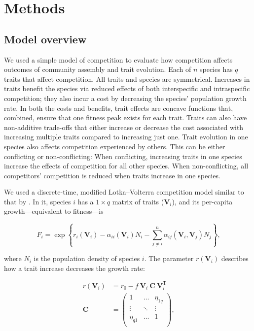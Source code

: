 
\section*{Methods}


\subsection*{Model overview}

We used a simple model of competition to evaluate how competition affects
outcomes of community assembly and trait evolution.
Each of $n$ species has $q$ traits that affect competition.
All traits and species are symmetrical.
Increases in traits benefit the species via reduced
effects of both interspecific and intraspecific competition;
they also incur a cost by decreasing the species' population growth rate.
In both the costs and benefits, trait effects are concave functions that,
combined, ensure that one fitness peak exists for each trait.
Traits can also have non-additive trade-offs that either increase or decrease
the cost associated with increasing multiple traits compared to increasing
just one.
Trait evolution in one species also affects competition experienced by others.
This can be either conflicting or non-conflicting:
When conflicting, increasing traits in one species increase the effects of
competition for all other species.
When non-conflicting, all competitors' competition is reduced when traits
increase in one species.

We used a discrete-time, modified Lotka--Volterra competition model similar to
that by \citet{Northfield:2013if}.
In it, species $i$ has a $1 \times q$ matrix of traits ($\mathbf{V}_i$), and
its per-capita growth---equivalent to fitness---is

\begin{equation} \label{eq:fitness}
    F_{i} = \exp \left\{ r_i(\mathbf{V}_i) - \alpha_{ii}(\mathbf{V}_i) N_i - \sum_{j \ne i}^{n}{
        \alpha_{ij}(\mathbf{V}_i, \mathbf{V}_j) N_j}  \right\}\textrm{,}
\end{equation}

\noindent where $N_i$ is the population density of  species $i$.
The parameter $r(\mathbf{V}_i)$ describes how a trait increase
decreases the growth rate:

\begin{equation} \label{eq:growth-rate}
\begin{split}
    r(\mathbf{V}_i) &= r_0 - f ~ \mathbf{V}_i ~ \mathbf{C} ~ \mathbf{V}_{i}^{\textrm{T}} \\
    \mathbf{C} &= \begin{pmatrix}
        1         & \ldots & \eta_{1q} \\
        \vdots    & \ddots & \vdots \\
        \eta_{q1} & \ldots & 1      \\
        \end{pmatrix}
    \textrm{,}
\end{split}
\end{equation}

